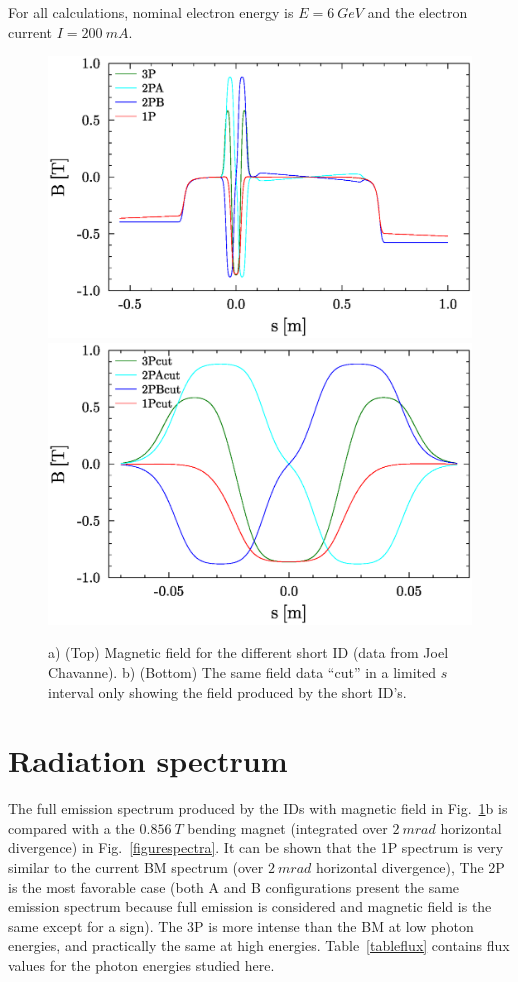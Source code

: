 \documentclass[a4paper,10pt]{article}
\begin{document}
For all calculations, nominal electron energy is $E=6~GeV$ and the electron current $I=200~mA$. 
\begin{figure}[H]
\label{figurewigglerfield}
\centering
\includegraphics[keepaspectratio,width=5in]{GRAPHICS/wiggler_field.eps}
\includegraphics[keepaspectratio,width=5in]{GRAPHICS/wiggler_field_cut.eps}
\caption{a) (Top) Magnetic field for the different short ID (data from Joel Chavanne). b) (Bottom) The same field data ``cut'' in a limited $s$ interval only showing the
field produced by the short ID's.} 
\end{figure}


\section{Radiation spectrum}
The full emission spectrum produced by the IDs with magnetic field in Fig.~\ref{figurewigglerfield}b is compared with 
a the $0.856~T$ bending magnet (integrated over $2~mrad$ horizontal divergence) in Fig.~\ref{figurespectra}. It can be shown that 
the 1P spectrum is very similar to the current BM spectrum (over $2~mrad$ horizontal divergence), The 2P is the most favorable case
(both A and B configurations present the same emission spectrum because full emission is considered and magnetic field is the 
same except for a sign). The 3P is more intense than the BM at low photon energies, and practically the same at high energies.
Table~\ref{tableflux} contains flux values for the photon energies studied here.
\end{document}
